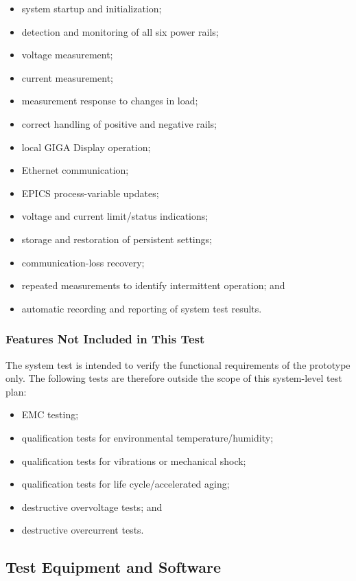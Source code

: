 \begin{itemize}
	\item system startup and initialization;
	\item detection and monitoring of all six power rails;
	\item voltage measurement;
	\item current measurement;
	\item measurement response to changes in load;
	\item correct handling of positive and negative rails;
	\item local GIGA Display operation;
	\item Ethernet communication;
	\item EPICS process-variable updates;
	\item voltage and current limit/status indications;
	\item storage and restoration of persistent settings;
	\item communication-loss recovery;
	\item repeated measurements to identify intermittent operation; and
	\item automatic recording and reporting of system test results.
\end{itemize}

\subsubsection{Features Not Included in This Test}

The system test is intended to verify the functional requirements of the prototype only. The following
tests are therefore outside the scope of this system-level test plan:

\begin{itemize}
	\item EMC testing;
	\item qualification tests for environmental temperature/humidity;
	\item qualification tests for vibrations or mechanical shock;
	\item qualification tests for life cycle/accelerated aging;
	\item destructive overvoltage tests; and
	\item destructive overcurrent tests.
\end{itemize}


\subsection{Test Equipment and Software}

